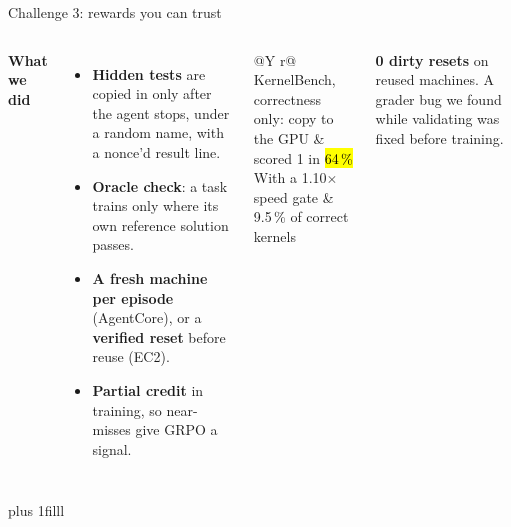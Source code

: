 \begin{frame}{Challenge 3: rewards you can trust}
\begin{columns}[T]
{\normalsize\textbf{What we did}}
\begin{itemize}\small\setlength{\itemsep}{1.2mm}
\item \textbf{Hidden tests} are copied in only after the agent stops, under a random name, with a nonce'd result line.
\item \textbf{Oracle check}: a task trains only where its own reference solution passes.
\item \textbf{A fresh machine per episode} (AgentCore), or a \textbf{verified reset} before reuse (EC2).
\item \textbf{Partial credit} in training, so near-misses give GRPO a signal.
\end{itemize}
\small\setlength{\tabcolsep}{4pt}\renewcommand{\arraystretch}{1.3}
\begin{tabularx}{\linewidth}{@{}Y r@{}}
\toprule
KernelBench, correctness only: copy  to the GPU & scored 1 in \hl{64\,\%}\\
With a 1.10$\times$ speed gate & 9.5\,\% of correct kernels\\
\bottomrule
\end{tabularx}
\par\vspace{2mm}
{\footnotesize\textbf{0 dirty resets} on reused machines. A grader bug we found while validating was fixed before training.\par}
\end{columns}
\par\vskip 0pt plus 1filll
\end{frame}

